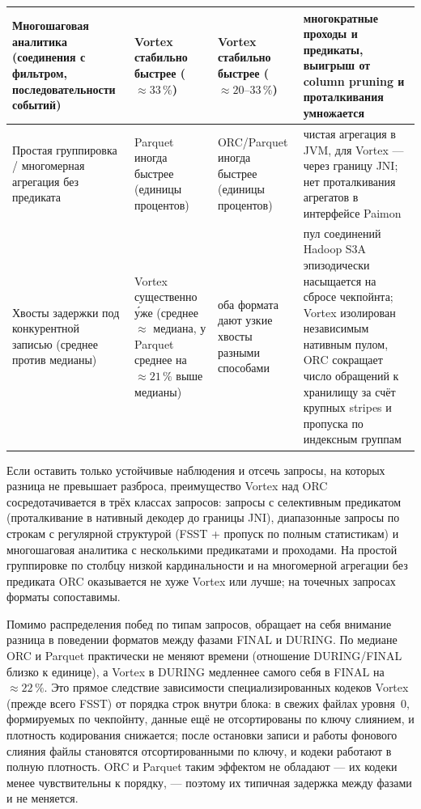 {\begin{xltabular}{\textwidth}{|>{\raggedright\arraybackslash}p{0.26\textwidth}|>{\raggedright\arraybackslash}p{0.18\textwidth}|>{\raggedright\arraybackslash}p{0.18\textwidth}|X|}
    Многошаговая аналитика (соединения с фильтром, последовательности событий) & Vortex стабильно быстрее ($\approx 33\,\%$) & Vortex стабильно быстрее ($\approx 20\text{--}33\,\%$) & многократные проходы и предикаты, выигрыш от column pruning и проталкивания умножается \\ \hline
    Простая группировка / многомерная агрегация без предиката & Parquet иногда быстрее (единицы процентов) & ORC/Parquet иногда быстрее (единицы процентов) & чистая агрегация в JVM, для Vortex --- через границу JNI; нет проталкивания агрегатов в интерфейсе Paimon \\ \hline
    Хвосты задержки под конкурентной записью (среднее против медианы) & Vortex существенно у́же (среднее $\approx$ медиана, у Parquet среднее на $\approx 21\,\%$ выше медианы) & оба формата дают узкие хвосты разными способами & пул соединений Hadoop S3A эпизодически насыщается на сбросе чекпойнта; Vortex изолирован независимым нативным пулом, ORC сокращает число обращений к хранилищу за счёт крупных stripes и пропуска по индексным группам \\ \hline
\end{xltabular}
}

Если оставить только устойчивые наблюдения и отсечь запросы, на которых разница
не превышает разброса, преимущество Vortex над ORC сосредотачивается в трёх
классах запросов: запросы с селективным предикатом (проталкивание в нативный
декодер до границы JNI), диапазонные запросы по строкам с регулярной структурой
(FSST + пропуск по полным статистикам) и многошаговая аналитика с несколькими
предикатами и проходами. На простой группировке по столбцу низкой кардинальности
и на многомерной агрегации без предиката ORC оказывается не хуже Vortex или
лучше; на точечных запросах форматы сопоставимы.

Помимо распределения побед по типам запросов, обращает на себя внимание разница
в поведении форматов между фазами FINAL и DURING. По медиане ORC и Parquet
практически не меняют времени (отношение DURING/FINAL близко к единице), а
Vortex в DURING медленнее самого себя в FINAL на $\approx 22\,\%$. Это прямое
следствие зависимости специализированных кодеков Vortex (прежде всего FSST) от
порядка строк внутри блока: в свежих файлах уровня~0, формируемых по чекпойнту,
данные ещё не отсортированы по ключу слиянием, и плотность кодирования снижается;
после остановки записи и работы фонового слияния файлы становятся отсортированными
по ключу, и кодеки работают в полную плотность. ORC и Parquet таким эффектом не
обладают --- их кодеки менее чувствительны к порядку, --- поэтому их типичная
задержка между фазами и не меняется.

